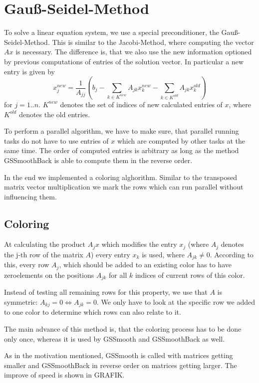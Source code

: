 \documentclass[a4paper,11pt]{scrartcl}
\begin{document}
\section{Gauß-Seidel-Method}
To solve a linear equation system, we use a special preconditioner, the
Gauß-Seidel-Method. This is similar to the Jacobi-Method, where computing
 the vector $Ax$ is necessary. The difference is,
that we also use the new information optioned by previous computations of
entries of the solution vector. In particular a new entry is given by
$$ x_j^{new} = \frac{1}{A_{jj}} \left(b_{j} - \sum_{k \in K^{new}}A_{jk}
 x_k^{new} - \sum_{k \in K^{old}}A_{jk} x_k^{old}\right)$$
for $j = 1..n$. $K^{new}$ denotes the set of indices of new calculated entries
 of $x$, where $K^{old}$ denotes the old entries.

To perform a parallel algorithm, we have to make sure, that parallel
running tasks do not have to use entries of $x$ which are computed by other
tasks at the same time. The order of computed entries is arbitrary as long as
the method GSSmoothBack is able to compute them in the reverse order.

In the end we implemented a coloring alghorithm.
Similar to the transposed matrix vector multiplication we mark the rows which
can run parallel without influencing them.

\subsection{Coloring}

At calculating the product $A_jx$ which modifies the entry $x_j$ (where $A_j$
denotes the j-th row of the matrix $A$) every entry $x_k$ is used, where
 $A_{jk} \neq 0$. According to this, every row $A_j$, which should be added
to an existing color has to have zeroelements on the positions $A_{jk}$ for
all $k$ indices of current rows of this color.

Instead of testing all remaining rows for this property, we use that $A$ is
 symmetric: $A_{kj} = 0 \Leftrightarrow A_{jk} = 0$. We only have to look
at the specific row we added to one color to determine which rows can also
 relate to it.

The main advance of this method is, that the coloring process has to be
 done only once, whereas it is used by GSSmooth and GSSmoothBack as well.

As in the motivation mentioned, GSSmooth is called with matrices getting
 smaller and GSSmoothBack in reverse order on matrices getting larger.
 The improve of speed is shown in GRAFIK.
\end{document}
